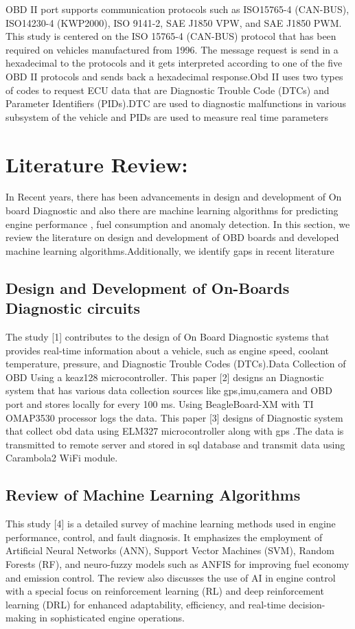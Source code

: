 \documentclass[conference]{IEEEtran}
\begin{document}
OBD II port supports communication protocols such as ISO15765-4 (CAN-BUS), ISO14230-4 (KWP2000), ISO 9141-2, SAE J1850 VPW, and SAE J1850 PWM.  This study is centered on the ISO 15765-4 (CAN-BUS) protocol that has been required on vehicles manufactured from 1996.
The message request is send in a hexadecimal to the protocols and it gets interpreted according  to one of the five OBD II protocols and sends back a hexadecimal response.Obd II uses two types of codes to request ECU data that are Diagnostic Trouble Code (DTCs) and Parameter Identifiers (PIDs).DTC are used to diagnostic malfunctions in various subsystem of the vehicle and PIDs are used to measure real time parameters 


\section{Literature Review:}
In Recent years, there has been advancements in design and development of On board Diagnostic and also there are machine learning algorithms for predicting engine performance , fuel consumption and anomaly detection. In this section, we review the literature on design and development of OBD boards and developed machine learning algorithms.Additionally, we identify gaps in recent literature
\subsection{Design and Development of On-Boards Diagnostic circuits}

The study [1] contributes to the design of On Board Diagnostic systems that provides real-time information about a vehicle, such as engine speed, coolant temperature, pressure, and Diagnostic Trouble Codes (DTCs).Data Collection of OBD Using a keaz128 microcontroller.
This paper [2] designs an Diagnostic system that has various data collection sources like gps,imu,camera and  OBD port and stores locally for every  100 ms. Using BeagleBoard-XM with TI OMAP3530 processor logs the data.
This paper [3] designs of Diagnostic system that collect obd data using  ELM327 microcontroller along with gps .The data is transmitted to remote server and stored in sql database and transmit data using Carambola2 WiFi module.

\subsection{Review of Machine Learning Algorithms}

This study [4] is a detailed survey of machine learning methods used in engine performance, control, and fault diagnosis. It emphasizes the employment of Artificial Neural Networks (ANN), Support Vector Machines (SVM), Random Forests (RF), and neuro-fuzzy models such as ANFIS for improving fuel economy and emission control. The review also discusses the use of AI in engine control with a special focus on reinforcement learning (RL) and deep reinforcement learning (DRL) for enhanced adaptability, efficiency, and real-time decision-making in sophisticated engine operations.
\end{document}
